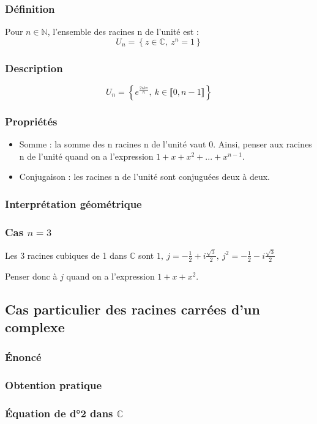 \documentclass[12pt,a4paper,french]{book}
\begin{document}
			\subsubsection{Définition}
			Pour $n \in \mathbb{N}$, l'ensemble des racines n de l'unité est :
			\[U_n = \left\{z \in \mathbb{C}, \ z^n = 1\right\}\]
			\subsubsection{Description}
			\[U_n = \left\{e^{\frac{2ik\pi}{n}},\ k \in \llbracket 0,n-1 \rrbracket \right\}\]
			\subsubsection{Propriétés}
			\begin{itemize}
				\item Somme : la somme des n racines n de l'unité vaut 0. Ainsi, penser aux racines n de l'unité quand on a l'expression $1 + x + x^2 + ... + x^{n-1}$.
				\item Conjugaison : les racines n de l'unité sont conjuguées deux à deux.
			\end{itemize}
			
			\subsubsection{Interprétation géométrique}
			\subsubsection{Cas $n=3$}
			Les 3 racines cubiques de 1 dans $\mathbb{C}$ sont $1,\ j = -\frac{1}{2}+i\frac{\sqrt{3}}{2},\ j^2 = -\frac{1}{2}-i\frac{\sqrt{3}}{2}$
			
			Penser donc à $j$ quand on a l'expression $1+x+x^2$.
		\subsection{Cas particulier des racines carrées d'un complexe}
			\subsubsection{Énoncé}
			\subsubsection{Obtention pratique}
			\subsubsection{Équation de d°2 dans $\mathbb{C}$}
\end{document}
